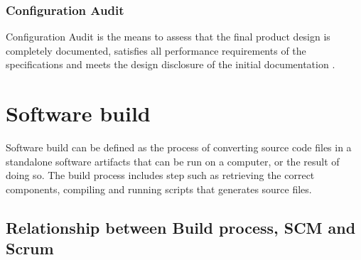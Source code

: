 \documentclass[../main.tex]{subfiles}
\begin{document}
\subsubsection{Configuration Audit}
Configuration Audit is the means to assess that the final product design is completely documented, satisfies all performance requirements of the specifications and meets the design disclosure of the initial documentation \cite{ieestandard}.
\section{Software build}
Software build can be defined as the process of converting source code files in a standalone software artifacts that can be run on a computer, or the result of doing so. The build process includes step such as retrieving the correct components, compiling and running scripts that generates source files.\\
\subsection{Relationship between Build process, SCM and Scrum}
\end{document}
